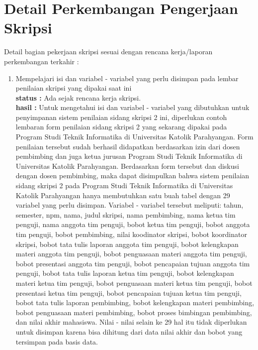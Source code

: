 \documentclass[a4paper,twoside]{article}
\begin{document}
\section{Detail Perkembangan Pengerjaan Skripsi}
Detail bagian pekerjaan skripsi sesuai dengan rencana kerja/laporan perkembangan terkahir :
	\begin{enumerate}
		\item Mempelajari isi dan variabel - variabel yang perlu disimpan pada lembar penilaian skripsi yang dipakai saat ini \\
		{\bf status :} Ada sejak rencana kerja skripsi.\\
		{\bf hasil :} Untuk mengetahui isi dan variabel - variabel yang dibutuhkan untuk penyimpanan sistem penilaian sidang skripsi 2 ini, diperlukan contoh lembaran form penilaian sidang skripsi 2 yang sekarang dipakai pada Program Studi Teknik Informatika di Universitas Katolik Parahyangan. Form penilaian tersebut sudah berhasil didapatkan berdasarkan izin dari dosen pembimbing dan juga ketua jurusan Program Studi Teknik Informatika di Universitas Katolik Parahyangan. Berdasarkan form tersebut dan diskusi dengan dosen pembimbing, maka dapat disimpulkan bahwa sistem penilaian sidang skripsi 2 pada Program Studi Teknik Informatika di Universitas Katolik Parahyangan hanya membutuhkan satu buah tabel dengan 29 variabel yang perlu disimpan.
		Variabel - variabel tersebut meliputi: tahun, semester, npm, nama, judul skripsi, nama pembimbing, nama ketua tim penguji, nama anggota tim penguji, bobot ketua tim penguji, bobot anggota tim penguji, bobot pembimbing, nilai koodinator skripsi, bobot koordinator skripsi, bobot tata tulis laporan anggota tim penguji, bobot kelengkapan materi anggota tim penguji, bobot penguasaan materi anggota tim penguji, bobot presentasi anggota tim penguji, bobot pencapaian tujuan anggota tim penguji, bobot tata tulis laporan ketua tim penguji, bobot kelengkapan materi ketua tim penguji, bobot penguasaan materi ketua tim penguji, bobot presentasi ketua tim penguji, bobot pencapaian tujuan ketua tim penguji, bobot tata tulis laporan pembimbing, bobot kelengkapan materi pembimbing, bobot penguasaan materi pembimbing, bobot proses bimbingan pembimbing, dan nilai akhir mahasiswa. Nilai - nilai selain ke 29 hal itu tidak diperlukan untuk disimpan karena bisa dihitung dari data nilai akhir dan bobot yang tersimpan pada basis data.
		

\end{enumerate}
\end{document}
